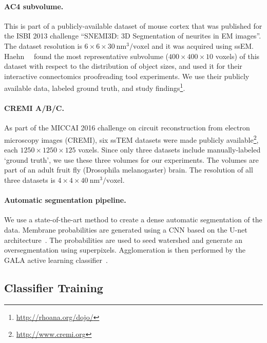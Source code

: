 \paragraph{AC4 subvolume.} This is part of a publicly-available dataset of mouse cortex that was published for the ISBI 2013 challenge ``SNEMI3D: 3D Segmentation of neurites in EM images''. The dataset resolution is $6\times6\times30~\text{nm}^3\text{/voxel}$ and it was acquired using ssEM. Haehn~\etal~\cite{haehn_dojo_2014} found the most representative subvolume ($400\times400\times10$ voxels) of this dataset with respect to the distribution of object sizes, and used it for their interactive connectomics proofreading tool experiments. We use their publicly available data, labeled ground truth, and study findings\footnote{\scriptsize{\url{http://rhoana.org/dojo/}}}.

\paragraph{CREMI A/B/C.} As part of the MICCAI 2016 challenge on circuit reconstruction from electron microscopy images (CREMI), six ssTEM datasets were made publicly available\footnote{\scriptsize{\url{http://www.cremi.org}}},  each $1250\times1250\times125$ voxels. Since only three datasets include manually-labeled `ground truth', we use these three volumes for our experiments. The volumes are part of an adult fruit fly (Drosophila melanogaster) brain. The resolution of all three datasets is $4\times4\times40~\text{nm}^3\text{/voxel}$.

\paragraph{Automatic segmentation pipeline.}
We use a state-of-the-art method to create a dense automatic segmentation of the data. Membrane probabilities are generated using a CNN based on the U-net architecture~\cite{RonnebergerFB15}. The probabilities are used to seed watershed and generate an oversegmentation using superpixels. Agglomeration is then performed by the GALA active learning classifier~\cite{nunez2014graph}.

\subsection{Classifier Training}

